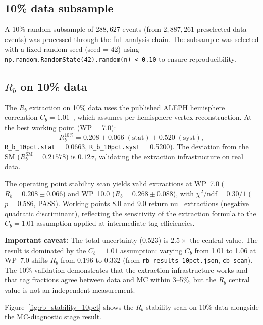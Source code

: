 \documentclass[11pt,a4paper]{article}
\begin{document}
\subsection{10\% data subsample}
\label{sec:subsample_10pct}

A 10\% random subsample of $288{,}627$ events (from $2{,}887{,}261$ preselected data events)
was processed through the full analysis chain. The subsample was selected with a fixed
random seed (seed = 42) using \texttt{np.random.RandomState(42).random(n) < 0.10} to ensure
reproducibility.

\subsection{$R_b$ on 10\% data}
\label{sec:result_rb_10pct}

The $R_b$ extraction on 10\% data uses the published ALEPH hemisphere correlation
$C_b = 1.01$~\cite{ALEPH:Rb:1996}, which assumes per-hemisphere vertex reconstruction.
At the best working point (WP = 7.0):
\begin{equation}
R_b^{10\%} = 0.208 \pm 0.066\;\mathrm{(stat)} \pm 0.520\;\mathrm{(syst)},
\label{eq:rb_10pct}
\end{equation}
\texttt{R\_b\_10pct.stat} = 0.0663, \texttt{R\_b\_10pct.syst} = 0.5200).
The deviation from the SM ($R_b^\mathrm{SM} = 0.21578$) is $0.12\sigma$, validating
the extraction infrastructure on real data.

The operating point stability scan yields valid extractions at WP~7.0
($R_b = 0.208 \pm 0.066$) and WP~10.0 ($R_b = 0.268 \pm 0.088$), with
$\chi^2/\mathrm{ndf} = 0.30/1$ ($p = 0.586$, PASS). Working points 8.0 and 9.0
return null extractions (negative quadratic discriminant), reflecting the sensitivity
of the extraction formula to the $C_b = 1.01$ assumption applied at intermediate
tag efficiencies.

\textbf{Important caveat:} The total uncertainty (0.523) is $2.5\times$ the central value.
The result is dominated by the $C_b = 1.01$ assumption: varying $C_b$ from 1.01 to 1.06
at WP~7.0 shifts $R_b$ from 0.196 to 0.332 (from \texttt{rb\_results\_10pct.json},
\texttt{cb\_scan}). The 10\% validation demonstrates that the extraction infrastructure
works and that tag fractions agree between data and MC within 3--5\%, but the $R_b$
central value is not an independent measurement.

Figure~\ref{fig:rb_stability_10pct} shows the $R_b$ stability scan on 10\% data
alongside the MC-diagnostic stage result.
\end{document}
